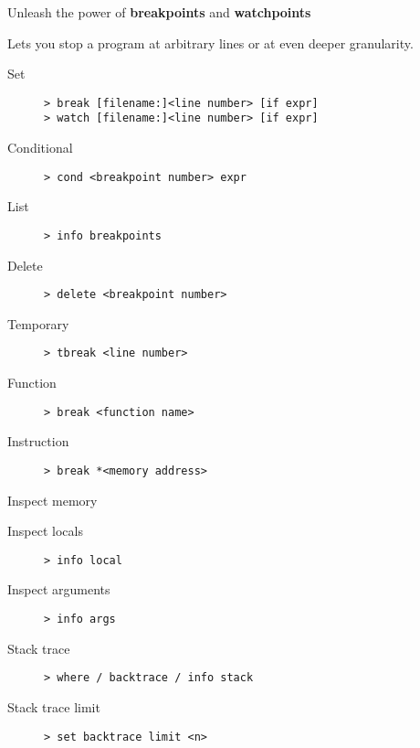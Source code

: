 \documentclass{beamer}
\begin{document}
  \begin{frame}{Unleash the power of \textbf{breakpoints} and \textbf{watchpoints}}
    
    Lets you stop a program at arbitrary lines or at even deeper granularity.

    \begin{description}
      \item[Set] \texttt{> break [filename:]<line number> [if expr]} \\
                 \texttt{> watch [filename:]<line number> [if expr]}
      \item[Conditional] \texttt{> cond <breakpoint number> expr}
      \item[List] \texttt{> info breakpoints}
      \item[Delete] \texttt{> delete <breakpoint number>}
      \item[Temporary] \texttt{> tbreak <line number>}
      \item[Function] \texttt{> break <function name>}
      \item[Instruction] \texttt{> break *<memory address>}
    \end{description}
  \end{frame}

  \begin{frame}{Inspect memory}
    \begin{description}
      \item[Inspect locals] \texttt{> info local}
      \item[Inspect arguments] \texttt{> info args}
      \item[Stack trace] \texttt{> where / backtrace / info stack}
      \item[Stack trace limit] \texttt{> set backtrace limit <n>}
    \end{description}
  \end{frame}
\end{document}
